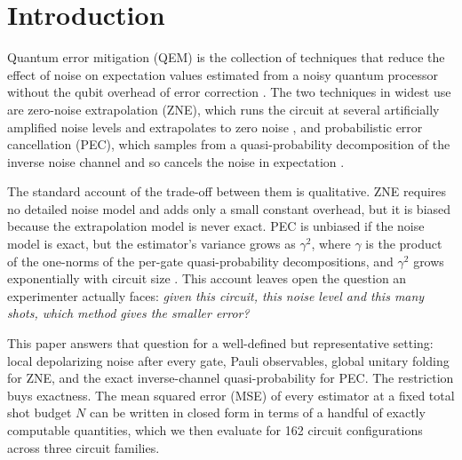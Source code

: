 \documentclass[11pt,a4paper]{article}
\theoremstyle{remark}
\begin{document}
\section{Introduction}

Quantum error mitigation (QEM) is the collection of techniques that reduce the effect of noise on expectation values estimated from a noisy quantum processor without the qubit overhead of error correction \cite{temme2017,li2017,endo2018,cai2023rmp}. The two techniques in widest use are zero-noise extrapolation (ZNE), which runs the circuit at several artificially amplified noise levels and extrapolates to zero noise \cite{temme2017,li2017,kandala2019,giurgicatiron2020,kim2023}, and probabilistic error cancellation (PEC), which samples from a quasi-probability decomposition of the inverse noise channel and so cancels the noise in expectation \cite{temme2017,endo2018,vandenberg2023}.

The standard account of the trade-off between them is qualitative. ZNE requires no detailed noise model and adds only a small constant overhead, but it is biased because the extrapolation model is never exact. PEC is unbiased if the noise model is exact, but the estimator's variance grows as $\gamma^2$, where $\gamma$ is the product of the one-norms of the per-gate quasi-probability decompositions, and $\gamma^2$ grows exponentially with circuit size \cite{temme2017,takagi2022,quek2022,tsubouchi2023}. This account leaves open the question an experimenter actually faces: \emph{given this circuit, this noise level and this many shots, which method gives the smaller error?}

This paper answers that question for a well-defined but representative setting: local depolarizing noise after every gate, Pauli observables, global unitary folding for ZNE, and the exact inverse-channel quasi-probability for PEC. The restriction buys exactness. The mean squared error (MSE) of every estimator at a fixed total shot budget $N$ can be written in closed form in terms of a handful of exactly computable quantities, which we then evaluate for 162 circuit configurations across three circuit families.
\end{document}
